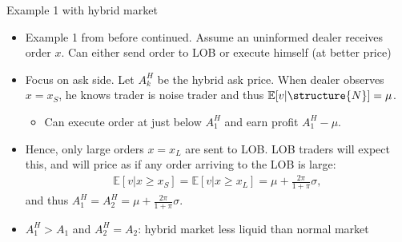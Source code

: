 \documentclass[english,10pt
,aspectratio=169
]{beamer}
\begin{document}
\begin{frame}{Example 1 with hybrid market}
	\begin{itemize}
		\item Example 1 from before continued. Assume an uninformed dealer receives order $x$. Can either send order to LOB or execute himself (at better price) 
		\pause
		\item Focus on ask side. Let $A^H_k$ be the hybrid ask price. When dealer observes $x=x_S$, he knows trader is noise trader and thus $\mathbb{E}[v|\structure{N}]=\mu$. 
		\begin{itemize}
			\item Can execute order at just below $A^H_1$ and earn profit $A^H_1-\mu$.
		\end{itemize}
		\pause
		\item Hence, only large orders $x=x_L$ are sent to LOB. LOB traders will expect this, and will price as if any order arriving to the LOB is large:
		\begin{align*}
			\mathbb{E}[v|x \ge x_S]=\mathbb{E}[v|x \ge x_L]=\mu+\frac{2\pi}{1+\pi} \sigma,
		\end{align*}
		and thus $A^H_1=A^H_2=\mu+\frac{2\pi}{1+\pi} \sigma$.
		\item $A^H_1>A_1$ and $A^H_2=A_2$: hybrid market less liquid than normal market 
	\end{itemize}
\end{frame}
\end{document}
